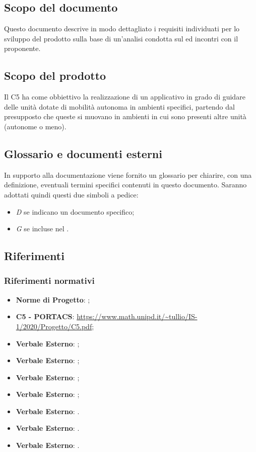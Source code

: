 \subsection{Scopo del documento}
Questo documento descrive in modo dettagliato i requisiti individuati per lo sviluppo del prodotto sulla base di un'analisi condotta sul  ed incontri con il proponente.

\subsection{Scopo del prodotto}
Il  C5 ha come obbiettivo la realizzazione di un applicativo  in grado di guidare delle unità dotate di mobilità autonoma in ambienti specifici, partendo dal presupposto che queste si muovano in ambienti in cui sono presenti altre unità (autonome o meno).

\subsection{Glossario e documenti esterni}
In supporto alla documentazione viene fornito un glossario per chiarire, con una definizione, eventuali termini specifici contenuti in questo documento.
Saranno adottati quindi questi due simboli a pedice:
\begin{itemize}
    \item \textit{D} se indicano un documento specifico;
    \item \textit{G} se incluse nel .
\end{itemize}

\subsection{Riferimenti}
    \subsubsection{Riferimenti normativi}
    \begin{itemize}
        \item \textbf{Norme di Progetto}: ;
        \item \textbf{{ C5 - PORTACS}}: \url{https://www.math.unipd.it/~tullio/IS-1/2020/Progetto/C5.pdf};
        \item \textbf{Verbale Esterno}: ;
        \item \textbf{Verbale Esterno}: ;
        \item \textbf{Verbale Esterno}: ;
        \item \textbf{Verbale Esterno}: ;
        \item \textbf{Verbale Esterno}: .
        \item \textbf{Verbale Esterno}: .
        \item \textbf{Verbale Esterno}: .
    \end{itemize}
